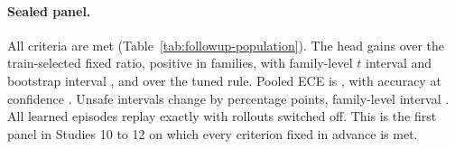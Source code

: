 \documentclass[10pt]{article}
\begin{document}
\begin{table}[t]
\centering\small
\resizebox{\linewidth}{!}{}
\caption{Study 12 on the sealed panel: heads trained on the development pool, evaluated once on \TypedPopFamilies{} families that no controller had run on (\TypedPopTraceSeeds{} trace seeds each, \TypedModelSeeds{} model seeds). The last row is the paired difference to the frozen payoff-weighted head of Study 10 on identical traces. Rows below the rule are secondary and carry no criterion.}\label{tab:followup-population}
\end{table}

\paragraph{Sealed panel.}
All \TypedPopCriteriaMet{} criteria are met (Table~\ref{tab:followup-population}). The head gains \TypedPopGain{} over the train-selected fixed ratio, positive in \TypedPopGainPositive{} families, with family-level $t$ interval \TypedPopGainT{} and bootstrap interval \TypedPopGainFamily{}, and \TypedPopGainVsRule{} \TypedPopGainVsRuleT{} over the tuned rule. Pooled ECE is \TypedPopEce{}, with accuracy \TypedPopAccuracy{} at confidence \TypedPopConfidence{}. Unsafe intervals change by \TypedPopUnsafe{} percentage points, family-level interval \TypedPopUnsafeFamily{}. All \TypedPopIsolationEpisodes{} learned episodes replay exactly with rollouts switched off. This is the first panel in Studies 10 to 12 on which every criterion fixed in advance is met.
\end{document}
